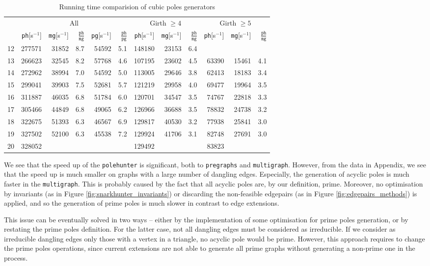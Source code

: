 \begin{table}[h!]\centering\begin{tabular}{r|rrrrr|rrr|rrr}
\multirow{2}{*}{} & \multicolumn{5}{|c|}{All} & \multicolumn{3}{|c|}{Girth $\geq 4$} & \multicolumn{3}{|c}{Girth $\geq 5$} \\
& \texttt{ph}[s$^{-1}$] & \texttt{mg}[s$^{-1}$] & $\frac{\texttt{ph}}{\texttt{mg}}$ & \texttt{pg}[s$^{-1}$] & $\frac{\texttt{ph}}{\texttt{pg}}$ & \texttt{ph}[s$^{-1}$] & \texttt{mg}[s$^{-1}$] & $\frac{\texttt{ph}}{\texttt{mg}}$ & \texttt{ph}[s$^{-1}$] & \texttt{mg}[s$^{-1}$] & $\frac{\texttt{ph}}{\texttt{mg}}$ \\ \hline 
12 & 277571 & 31852 & 8.7 & 54592 & 5.1 & 148180 & 23153 & 6.4\\
13 & 266623 & 32545 & 8.2 & 57768 & 4.6 & 107195 & 23602 & 4.5 & 63390 & 15461 & 4.1\\
14 & 272962 & 38994 & 7.0 & 54592 & 5.0 & 113005 & 29646 & 3.8 & 62413 & 18183 & 3.4\\
15 & 299041 & 39903 & 7.5 & 52681 & 5.7 & 121219 & 29958 & 4.0 & 69477 & 19964 & 3.5\\
16 & 311887 & 46035 & 6.8 & 51784 & 6.0 & 120701 & 34547 & 3.5 & 74767 & 22818 & 3.3\\
17 & 305466 & 44849 & 6.8 & 49065 & 6.2 & 126966 & 36688 & 3.5 & 78832 & 24738 & 3.2\\
18 & 322675 & 51393 & 6.3 & 46567 & 6.9 & 129817 & 40530 & 3.2 & 77938 & 25841 & 3.0\\
19 & 327502 & 52100 & 6.3 & 45538 & 7.2 & 129924 & 41706 & 3.1 & 82748 & 27691 & 3.0\\
20 & 328052 & & & & & 129492 & & & 83823 & &
\end{tabular}
\caption{Running time comparision of cubic poles generators}
\label{tab:speed}
\end{table}

We see that the speed up of the \texttt{polehunter} is significant, both to \texttt{pregraphs} and \texttt{multigraph}. However, from the data in Appendix, we see that the speed up is much smaller on graphs with a large number of dangling edges. Especially, the generation of acyclic poles is much faster in the \texttt{multigraph}. This is probably caused by the fact that all acyclic poles are, by our definition, prime. Moreover, no optimisation by invariants (as in Figure \ref{fig:snarkhunter_invariants}) or discarding the non-feasible edgepairs (as in Figure \ref{fig:edgepairs_methods}) is applied, and so the generation of prime poles is much slower in contrast to edge extensions.

This issue can be eventually solved in two ways -- either by the implementation of some optimisation for prime poles generation, or by restating the prime poles definition. For the latter case, not all dangling edges must be considered as irreducible. If we consider as irreducible dangling edges only those with a vertex in a triangle, no acyclic pole would be prime. However, this approach requires to change the prime poles operations, since current extensions are not able to generate all prime graphs without generating a non-prime one in the process.